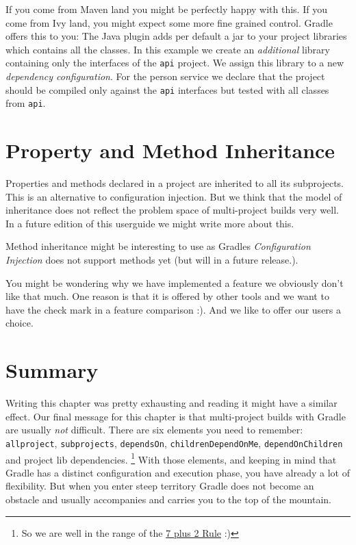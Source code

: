 If you come from Maven land you might be perfectly happy with this. If you come from Ivy land, you might expect some more fine grained control. Gradle offers this to you:
The Java plugin adds per default a jar to your project libraries which contains all the classes. In this example we create an \emph{additional} library containing only the interfaces of the \texttt{api} project. We assign this library to a new \emph{dependency configuration}. For the person service we declare that the project should be compiled only against the \texttt{api} interfaces but tested with all classes from \texttt{api}.

\section{Property and Method Inheritance} %
\label{sec:property_and_method_inheritance}
Properties and methods declared in a project are inherited to all its subprojects. This is an alternative to configuration injection. But we think that the model of inheritance does not reflect the problem space of multi-project builds very well. In a future edition of this userguide we might write more about this. 

Method inheritance might be interesting to use as Gradles \emph{Configuration Injection} does not support methods yet (but will in a future release.).

You might be wondering why we have implemented a feature we obviously don't like that much. One reason is that it is offered by other tools and we want to have the check mark in a feature comparison :). And we like to offer our users a choice.

\section{Summary} %
\label{sec:summary}
Writing this chapter was pretty exhausting and reading it might have a similar effect. Our final message for this chapter is that multi-project builds with Gradle are usually \emph{not} difficult. There are six elements you need to remember: \texttt{allproject}, \texttt{subprojects}, \texttt{dependsOn}, \texttt{childrenDependOnMe}, \texttt{dependOnChildren} and project lib dependencies. 
\footnote{So we are well in the range of the \href{http://en.wikipedia.org/wiki/The_Magical_Number_Seven,_Plus_or_Minus_Two}{7 plus 2 Rule} :)}
With those elements, and keeping in mind that Gradle has a distinct configuration and execution phase, you have already a lot of flexibility. But when you enter steep territory Gradle does not become an obstacle and usually accompanies and carries you to the top of the mountain.


